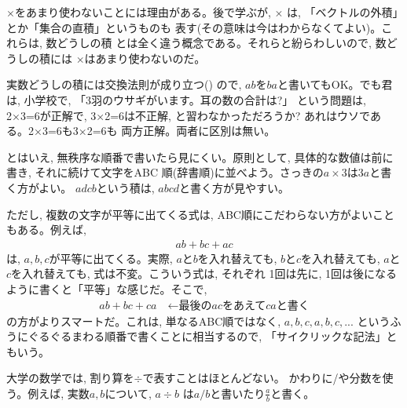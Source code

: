 $\times$をあまり使わないことには理由がある。後で学ぶが, $\times$
は, 「ベクトルの外積」とか「集合の直積」というものも
表す(その意味は今はわからなくてよい)。これらは, 数どうしの積
とは全く違う概念である。それらと紛らわしいので, 数どうしの積には
$\times$はあまり使わないのだ。\mv

実数どうしの積には交換法則が成り立つ()
ので, $ab$を$ba$と書いてもOK。でも君は, 
小学校で, 「3羽のウサギがいます。耳の数の合計は?」
という問題は, 2×3=6が正解で, 3×2=6は不正解, 
と習わなかっただろうか? あれはウソである。2×3=6も3×2=6も
両方正解。両者に区別は無い。

とはいえ, 無秩序な順番で書いたら見にくい。原則として, 
具体的な数値は前に書き, それに続けて文字をABC
順(辞書順)に並べよう。さっきの$a\times3$は$3a$と書く方がよい。
$adcb$という積は, $abcd$と書く方が見やすい。

ただし, 複数の文字が平等に出てくる式は, ABC順にこだわらない方がよいこともある。例えば, 
\begin{eqnarray}
ab+bc+ac\label{eq:ab_bc_ac}
\end{eqnarray}
は, $a, b, c$が平等に出てくる。実際, $a$と$b$を入れ替えても, $b$と$c$を入れ替えても, 
$a$と$c$を入れ替えても, 式は不変。こういう式は, それぞれ
1回は先に, 1回は後になるように書くと「平等」な感じだ。そこで, 
\begin{eqnarray*}
ab+bc+ca\quad\text{←最後の$ac$をあえて$ca$と書く}
\end{eqnarray*}
の方がよりスマートだ。これは, 
単なるABC順ではなく, $a, b, c, a, b, c, ...$
というふうにぐるぐるまわる順番で書くことに相当するので, 
「サイクリックな記法」ともいう。\mv

大学の数学では, 割り算を$\div$で表すことはほとんどない。
かわりに/や分数を使う。例えば, 実数$a, b$について, $a\div b$
は$a/b$と書いたり$\frac{a}{b}$と書く。

